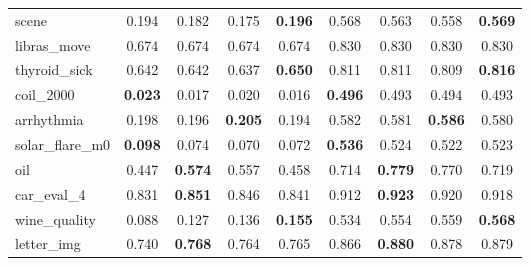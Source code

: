\begin{figure}[ht]
\begin{tabular}{p{22mm}|*4{p{14mm}}|*4{p{14mm}}}
        scene&\multicolumn{1}{c}{0.194}&\multicolumn{1}{c}{0.182}&\multicolumn{1}{c}{0.175}&\multicolumn{1}{c|}{\textbf{0.196}}&\multicolumn{1}{c}{0.568}&\multicolumn{1}{c}{0.563}&\multicolumn{1}{c}{0.558}&\multicolumn{1}{c}{\textbf{0.569}}\\
        libras\_move&\multicolumn{1}{c}{0.674}&\multicolumn{1}{c}{0.674}&\multicolumn{1}{c}{0.674}&\multicolumn{1}{c|}{0.674}&\multicolumn{1}{c}{0.830}&\multicolumn{1}{c}{0.830}&\multicolumn{1}{c}{0.830}&\multicolumn{1}{c}{0.830}\\
        thyroid\_sick&\multicolumn{1}{c}{0.642}&\multicolumn{1}{c}{0.642}&\multicolumn{1}{c}{0.637}&\multicolumn{1}{c|}{\textbf{0.650}}&\multicolumn{1}{c}{0.811}&\multicolumn{1}{c}{0.811}&\multicolumn{1}{c}{0.809}&\multicolumn{1}{c}{\textbf{0.816}}\\
        coil\_2000&\multicolumn{1}{c}{\textbf{0.023}}&\multicolumn{1}{c}{0.017}&\multicolumn{1}{c}{0.020}&\multicolumn{1}{c|}{0.016}&\multicolumn{1}{c}{\textbf{0.496}}&\multicolumn{1}{c}{0.493}&\multicolumn{1}{c}{0.494}&\multicolumn{1}{c}{0.493}\\
        arrhythmia&\multicolumn{1}{c}{0.198}&\multicolumn{1}{c}{0.196}&\multicolumn{1}{c}{\textbf{0.205}}&\multicolumn{1}{c|}{0.194}&\multicolumn{1}{c}{0.582}&\multicolumn{1}{c}{0.581}&\multicolumn{1}{c}{\textbf{0.586}}&\multicolumn{1}{c}{0.580}\\
        solar\_flare\_m0&\multicolumn{1}{c}{\textbf{0.098}}&\multicolumn{1}{c}{0.074}&\multicolumn{1}{c}{0.070}&\multicolumn{1}{c|}{0.072}&\multicolumn{1}{c}{\textbf{0.536}}&\multicolumn{1}{c}{0.524}&\multicolumn{1}{c}{0.522}&\multicolumn{1}{c}{0.523}\\
        oil&\multicolumn{1}{c}{0.447}&\multicolumn{1}{c}{\textbf{0.574}}&\multicolumn{1}{c}{0.557}&\multicolumn{1}{c|}{0.458}&\multicolumn{1}{c}{0.714}&\multicolumn{1}{c}{\textbf{0.779}}&\multicolumn{1}{c}{0.770}&\multicolumn{1}{c}{0.719}\\
        car\_eval\_4&\multicolumn{1}{c}{0.831}&\multicolumn{1}{c}{\textbf{0.851}}&\multicolumn{1}{c}{0.846}&\multicolumn{1}{c|}{0.841}&\multicolumn{1}{c}{0.912}&\multicolumn{1}{c}{\textbf{0.923}}&\multicolumn{1}{c}{0.920}&\multicolumn{1}{c}{0.918}\\
        wine\_quality&\multicolumn{1}{c}{0.088}&\multicolumn{1}{c}{0.127}&\multicolumn{1}{c}{0.136}&\multicolumn{1}{c|}{\textbf{0.155}}&\multicolumn{1}{c}{0.534}&\multicolumn{1}{c}{0.554}&\multicolumn{1}{c}{0.559}&\multicolumn{1}{c}{\textbf{0.568}}\\
        letter\_img&\multicolumn{1}{c}{0.740}&\multicolumn{1}{c}{\textbf{0.768}}&\multicolumn{1}{c}{0.764}&\multicolumn{1}{c|}{0.765}&\multicolumn{1}{c}{0.866}&\multicolumn{1}{c}{\textbf{0.880}}&\multicolumn{1}{c}{0.878}&\multicolumn{1}{c}{0.879}\\

\end{tabular}
\end{figure}
